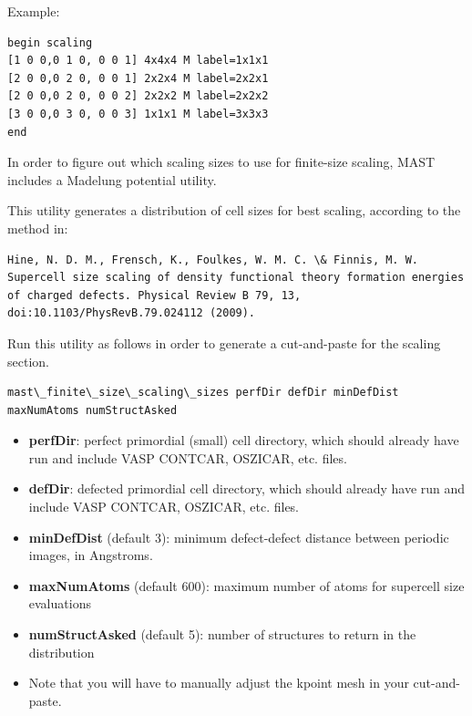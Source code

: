 \documentclass[letterpaper,10pt,english]{sphinxmanual}
\begin{document}
Example:

\begin{Verbatim}[commandchars=\\\{\}]
begin scaling
[1 0 0,0 1 0, 0 0 1] 4x4x4 M label=1x1x1
[2 0 0,0 2 0, 0 0 1] 2x2x4 M label=2x2x1
[2 0 0,0 2 0, 0 0 2] 2x2x2 M label=2x2x2
[3 0 0,0 3 0, 0 0 3] 1x1x1 M label=3x3x3
end
\end{Verbatim}

In order to figure out which scaling sizes to use for finite-size scaling, MAST includes a Madelung potential utility.

This utility generates a distribution of cell sizes for best scaling, according to the method in:

\begin{Verbatim}[commandchars=\\\{\}]
Hine, N. D. M., Frensch, K., Foulkes, W. M. C. \& Finnis, M. W. Supercell size scaling of density functional theory formation energies of charged defects. Physical Review B 79, 13, doi:10.1103/PhysRevB.79.024112 (2009).
\end{Verbatim}

Run this utility as follows in order to generate a cut-and-paste for the scaling section.

\begin{Verbatim}[commandchars=\\\{\}]
mast\_finite\_size\_scaling\_sizes perfDir defDir minDefDist maxNumAtoms numStructAsked
\end{Verbatim}
\begin{itemize}
\item {} 
\textbf{perfDir}: perfect primordial (small) cell directory, which should already have run and include VASP CONTCAR, OSZICAR, etc. files.

\item {} 
\textbf{defDir}: defected primordial cell directory, which should already have run and include VASP CONTCAR, OSZICAR, etc. files.

\item {} 
\textbf{minDefDist} (default 3): minimum defect-defect distance between periodic images, in Angstroms.

\item {} 
\textbf{maxNumAtoms} (default 600): maximum number of atoms for supercell size evaluations

\item {} 
\textbf{numStructAsked} (default 5): number of structures to return in the distribution

\item {} 
Note that you will have to manually adjust the kpoint mesh in your cut-and-paste.

\end{itemize}
\end{document}
